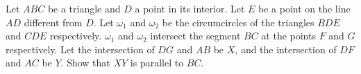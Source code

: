 Let $ABC$ be a triangle and $D$ a point in its interior. Let $E$ be a point on the
line $AD$ different from $D$. Let $\omega_1$ and $\omega_2$ be the circumcircles of the
triangles $BDE$ and $CDE$ respectively. $\omega_1$ and $\omega_2$ intersect the segment $BC$ at
the points $F$ and $G$ respectively. Let the intersection of $DG$ and $AB$ be $X$,
and the intersection of $DF$ and $AC$ be $Y$. Show that $XY$ is parallel to $BC$.